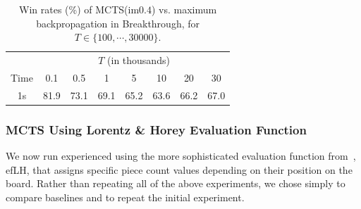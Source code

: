 \documentclass[conference]{IEEEtran}
\begin{document}
\begin{table}[t]
{\small
\begin{center}
\begin{tabular}{|c|ccccccc|}
\hline
                     & \multicolumn{7}{|c|}{$T$ (in thousands)}             \\
Time                & 0.1  & 0.5  & 1    & 5    & 10   & 20 & 30 \\
\hline
1s                 & 81.9 & 73.1 & 69.1 & 65.2 & 63.6 & 66.2 & 67.0 \\
\hline
\end{tabular}
\end{center}
\caption{Win rates (\%) of MCTS(im$0.4$) vs. maximum backpropagation in Breakthrough, 
for $T \in \{ 100, \cdots, 30000 \}$. }
\label{tbl:maxbackprop}
}
\end{table}


\subsubsection*{MCTS Using Lorentz \& Horey Evaluation Function}

We now run experienced using the more sophisticated evaluation function from~\cite{Lorentz13Breakthrough}, 
efLH, that assigns specific piece count values depending on their position on the board. 
Rather than repeating all of the above experiments, we chose simply to compare baselines and to repeat
the initial experiment. 
\end{document}
